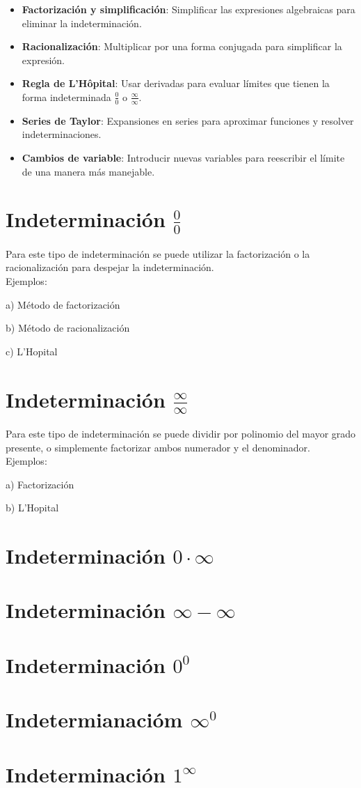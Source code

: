 \documentclass[12pt, a4paper]{article}
\begin{document}
\begin{itemize}
    \item \textbf{Factorización y simplificación}: Simplificar las expresiones algebraicas para eliminar la indeterminación.
    \item \textbf{Racionalización}: Multiplicar por una forma conjugada para simplificar la expresión.
    \item \textbf{Regla de L'Hôpital}: Usar derivadas para evaluar límites que tienen la forma indeterminada $\displaystyle \frac{0}{0} $ o $\displaystyle \frac{\infty}{\infty}$.
    \item \textbf{Series de Taylor}: Expansiones en series para aproximar funciones y resolver indeterminaciones.
    \item \textbf{Cambios de variable}: Introducir nuevas variables para reescribir el límite de una manera más manejable.
\end{itemize}

\section{Indeterminación $\displaystyle \frac{0}{0}$}
Para este tipo de indeterminación se puede utilizar la factorización o la racionalización para despejar la indeterminación.\\[6pt]
Ejemplos:

\vspace{0.5cm}
a) Método de factorización

b) Método de racionalización

c) L'Hopital


\section{Indeterminación $\displaystyle \frac{\infty}{\infty}$}
Para este tipo de indeterminación se puede dividir por polinomio del mayor grado presente, o simplemente factorizar ambos numerador y el denominador.\\[6pt]
Ejemplos:

\vspace{0.5cm}
a) Factorización

b) L'Hopital

\section{Indeterminación $\displaystyle 0 \cdot \infty$}


\section{Indeterminación $\displaystyle \infty - \infty$}
\section{Indeterminación $\displaystyle 0^0$}
\section{Indetermianacióm $\displaystyle \infty^0$}
\section{Indeterminación $\displaystyle 1^\infty$} 
\end{document}
